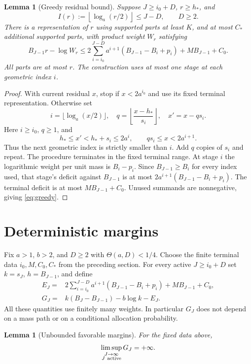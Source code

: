 \documentclass[11pt]{amsart}
\newtheorem{lemma}[theorem]{Lemma}
\theoremstyle{remark}\newtheorem{remark}[theorem]{Remark}
\begin{document}
\begin{lemma}[Greedy residual bound]\label{lem:greedy}
Suppose $J\ge i_0+D$, $r\ge h_*$, and
\[
 I(r):=\left\lfloor\log_a(r/2)\right\rfloor\le J-D,
 \qquad D\ge2.
\]
There is a representation of $r$ using supported parts at least $K$, and
at most $C_*$ additional supported parts, with product weight $W_r$ satisfying
\begin{equation}\label{eq:greedy}
 B_{J-1}r-\log W_r
 \le 2\sum_{i=i_0}^{J-D}a^{i+1}
       (B_{J-1}-B_i+p_i)+MB_{J-1}+C_0.
\end{equation}
All parts are at most $r$. The construction uses at most one stage at each
geometric index $i$.
\end{lemma}

\begin{proof}
With current residual $x$, stop if $x<2a^{i_0}$ and use its fixed terminal
representation. Otherwise set
\[
 i=\lfloor\log_a(x/2)\rfloor,\quad
 q=\left\lfloor\frac{x-h_*}{s_i}\right\rfloor,\quad
 x'=x-qs_i.
\]
Here $i\ge i_0$, $q\ge1$, and
\[
 h_*\le x'<h_*+s_i\le2a^i,\qquad qs_i\le x<2a^{i+1}.
\]
Thus the next geometric index is strictly smaller than $i$. Add $q$ copies
of $s_i$ and repeat. The procedure terminates in the fixed terminal range.
At stage $i$ the logarithmic weight per unit mass is $B_i-p_i$.
Since $B_{J-1}\ge B_i$ for every index used, that stage's deficit against
$B_{J-1}$ is at most
$2a^{i+1}(B_{J-1}-B_i+p_i)$. The terminal deficit is at most
$MB_{J-1}+C_0$. Unused summands are nonnegative, giving \eqref{eq:greedy}.
\end{proof}

\section{Deterministic margins}\label{sec:margin}
Fix $a>1$, $b>2$, and $D\ge2$ with $\Theta(a,D)<1/4$. Choose the finite
terminal data $i_0,M,C_0,C_*$ from the preceding section. For every active
$J\ge i_0+D$ set $k=s_J$, $h=B_{J-1}$, and define
\begin{align}
 E_J={}&2\sum_{i=i_0}^{J-D}a^{i+1}(B_{J-1}-B_i+p_i)
             +MB_{J-1}+C_0,\label{eq:energy}\\
 G_J={}&k(B_J-B_{J-1})-b\log k-E_J.\label{eq:margin}
\end{align}
All these quantities use finitely many weights. In particular $G_J$ does
not depend on a mass path or on a conditional allocation probability.

\begin{lemma}[Unbounded favorable margins]\label{lem:margin}
For the fixed data above,
\begin{equation}\label{eq:marginlimsup}
 \limsup_{\substack{J\to\infty\\J\ {\rm active}}}G_J=+\infty.
\end{equation}
\end{lemma}
\end{document}
